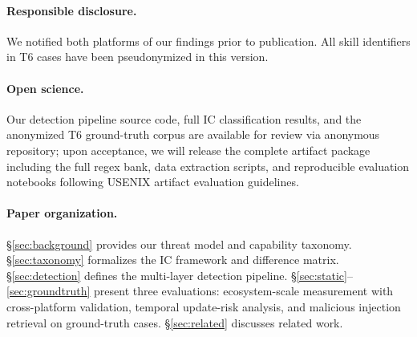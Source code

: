 \paragraph{Responsible disclosure.}
We notified both platforms of our findings prior to publication.
All skill identifiers in T6 cases have been pseudonymized in this version.

\paragraph{Open science.}
Our detection pipeline source code, full \NskillsDMR{} IC classification
results, and the anonymized T6 ground-truth corpus are available
for review via anonymous repository;
upon acceptance, we will release the complete artifact package including
the full \lscps{} regex bank, data extraction scripts,
and reproducible evaluation notebooks following USENIX artifact evaluation guidelines.

\paragraph{Paper organization.}
\S\ref{sec:background} provides our threat model and capability taxonomy.
\S\ref{sec:taxonomy} formalizes the IC framework and difference matrix.
\S\ref{sec:detection} defines the multi-layer detection pipeline.
\S\ref{sec:static}--\ref{sec:groundtruth} present three evaluations:
ecosystem-scale measurement with cross-platform validation,
temporal update-risk analysis,
and malicious injection retrieval on ground-truth cases.
\S\ref{sec:related} discusses related work.
